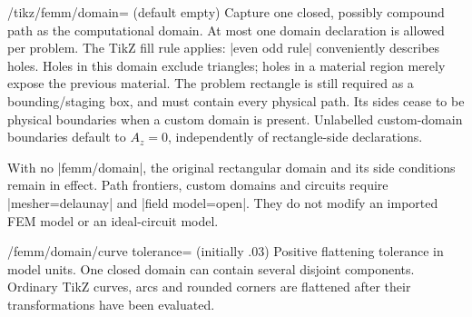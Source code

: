 \begin{key}{/tikz/femm/domain= (default \normalfont empty)}
Capture one closed, possibly compound path as the computational domain. At most
one domain declaration is allowed per problem. The TikZ fill rule applies:
|even odd rule| conveniently describes holes. Holes in this domain exclude
triangles; holes in a material region merely expose the previous material.
The problem rectangle is still required as a bounding/staging box, and must
contain every physical path. Its sides cease to be physical boundaries when a
custom domain is present. Unlabelled custom-domain boundaries default to
$A_z=0$, independently of rectangle-side declarations.

With no |femm/domain|, the original rectangular domain and its side conditions
remain in effect. Path frontiers, custom domains and circuits require
|mesher=delaunay| and |field model=open|. They do not modify an imported FEM
model or an ideal-circuit model.
\end{key}
\begin{key}{/femm/domain/curve tolerance= (initially .03)}
Positive flattening tolerance in model units. One closed domain can contain
several disjoint components. Ordinary TikZ curves, arcs and rounded corners are
flattened after their transformations have been evaluated.
\end{key}

